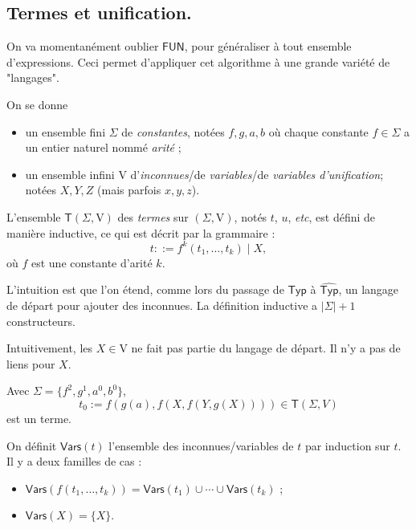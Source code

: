 \documentclass[../main]{subfiles}
\begin{document}
  \subsection{Termes et unification.}

  On va momentanément oublier $\mathsf{FUN}$, pour généraliser à tout ensemble d'expressions.
  Ceci permet d'appliquer cet algorithme à une grande variété de "langages".

  \begin{defn}
    On se donne
    \begin{itemize}
      \item un ensemble fini $\Sigma$ de  \textit{constantes}, notées $f, g, a, b$ où chaque constante  $f \in \Sigma$ a un entier naturel nommé \textit{arité} ;
      \item un ensemble infini $\mathrm{V}$ d'\textit{inconnues}/de \textit{variables}/de \textit{variables d'unification}; notées $X, Y, Z$ (mais parfois $x, y,z$).
    \end{itemize}

    L'ensemble $\mathsf{T}(\Sigma, \mathrm{V})$ des \textit{termes} sur $(\Sigma, \mathrm{V})$, notés  $t$, $u$, \textit{etc}, est défini de manière inductive, ce qui est décrit par la grammaire : \[
    t ::= f^k (t_1, \ldots, t_k) \mid X
    ,\] 
    où $f$ est une constante d'arité $k$.
  \end{defn}

  \begin{rmk}
    L'intuition est que l'on étend, comme lors du passage de $\mathsf{Typ}$ à $\widehat{\mathsf{Typ}}$, un langage de départ pour ajouter des inconnues.
    La définition inductive a $|\Sigma| + 1$ constructeurs.

    Intuitivement, les  $X \in \mathrm{V}$ ne fait pas partie du langage de départ.
    Il n'y a pas de liens pour $X$.
  \end{rmk}

  \begin{exm}
    Avec $\Sigma = \{f^2, g^1, a^0, b^0\}$, \[
      t_0 := f(g(a), f(X, f(Y, g(X)))) \in \mathsf{T}(\Sigma, V)
    \]
    est un terme.
  \end{exm}

  \begin{defn}
    On définit $\mathsf{Vars}(t)$ l'ensemble des inconnues/variables de $t$ par induction sur $t$.
    Il y a deux familles de cas :
    \begin{itemize}
      \item $\mathsf{Vars}(f(t_1, \ldots, t_k)) = \mathsf{Vars}(t_1) \cup \cdots \cup \mathsf{Vars}(t_k)$ ;
      \item $\mathsf{Vars}(X) = \{X\}$.
    \end{itemize}
  \end{defn}
\end{document}
